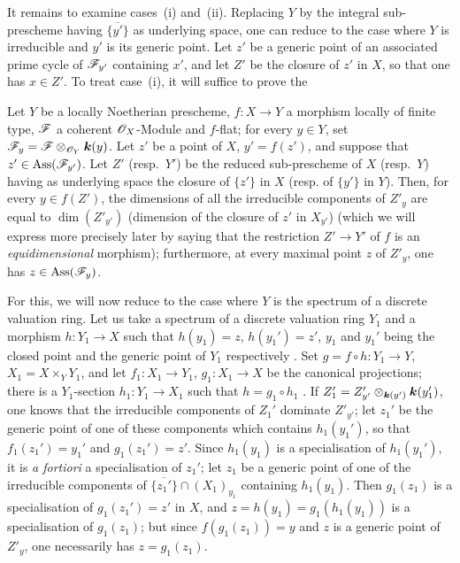 \begin{env}[12.1.1.4]
\label{IV.12.1.1.4}
It remains to examine cases~(i) and~(ii).
Replacing $Y$ by the integral sub-prescheme having $\overline{\{y'\}}$ as underlying space, one can reduce to the case where $Y$ is irreducible and $y'$ is its generic point. Let $z'$ be a generic point of an associated prime cycle of $\mathscr{F}_{y'}$
containing $x'$, and let $Z'$ be the closure of $z'$ in $X$, so that one has $x\in Z'$.
To treat case~(i), it will suffice to prove the

\begin{proposition}[12.1.1.5]
\label{IV.12.1.1.5}
Let $Y$ be a locally Noetherian prescheme, $f:X\to Y$ a morphism locally of finite type, $\mathscr{F}$ a coherent $\mathscr{O}_X$-Module and $f$-\textup{flat}; for every $y\in Y$, set $\mathscr{F}_y=\mathscr{F}\otimes_{\mathscr{O}_Y}\boldsymbol{k}(y)$.
Let $z'$ be a point of $X$, $y'=f(z')$, and suppose that $z'\in\operatorname{Ass}(\mathscr{F}_{y'})$.
Let $Z'$ \textup{(resp.\ $Y'$)} be the reduced sub-prescheme of $X$ \textup{(resp.\ $Y$)} having as underlying space the closure of $\{z'\}$ in $X$ \textup{(resp.} of $\{y'\}$ in $Y$\textup{)}.
Then, for every $y\in f(Z')$, the dimensions of all the irreducible components of $Z'_y$ are equal to $\dim(Z'_{y'})$ \textnormal{(}dimension of the closure of $z'$ in $X_{y'}$\textnormal{)} \textup{(which we will express more precisely later  by saying that the restriction $Z'\to Y'$ of $f$ is an \emph{equidimensional} morphism)}; furthermore, at every maximal point $z$ of $Z'_y$, one has $z\in\operatorname{Ass}(\mathscr{F}_y)$.
\end{proposition}

For this, we will now reduce to the case where $Y$ is the spectrum of a discrete valuation ring.
Let us take a spectrum of a discrete valuation ring $Y_1$ and a morphism $h:Y_1\to X$ such that $h(y_1)=z$, $h(y_1')=z'$, $y_1$ and $y_1'$ being the closed point and the generic point of $Y_1$ respectively .
Set $g=f\circ h:Y_1\to Y$, $X_1=X\times_Y Y_1$, and let $f_1:X_1\to Y_1$, $g_1:X_1\to X$ be the canonical projections; there is a $Y_1$-section $h_1:Y_1\to X_1$ such that $h=g_1\circ h_1$ .
If $Z_1'=Z'_{y'}\otimes_{\boldsymbol{k}(y')}\boldsymbol{k}(y_1')$, one knows  that the irreducible components of $Z_1'$ dominate $Z'_{y'}$; let $z_1'$ be the generic point of one of these components which contains $h_1(y_1')$, so that $f_1(z_1')=y_1'$ and $g_1(z_1')=z'$.
Since $h_1(y_1)$ is a specialisation of $h_1(y_1')$, it is \emph{a fortiori} a specialisation of $z_1'$; let $z_1$ be a generic point of one of the irreducible components of $\overline{\{z_1'\}}\cap(X_1)_{y_1}$ containing $h_1(y_1)$.
Then $g_1(z_1)$ is a specialisation of $g_1(z_1')=z'$ in $X$, and $z=h(y_1)=g_1(h_1(y_1))$ is a specialisation of $g_1(z_1)$; but since $f(g_1(z_1))=y$ and $z$ is a generic point of $Z'_y$, one necessarily has $z=g_1(z_1)$.


\end{env}
